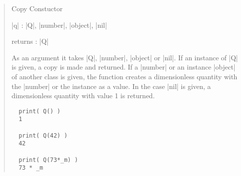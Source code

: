 \documentclass{ltxdoc}
\begin{document}
\begin{quote}
  Copy Constuctor

  \begin{description}
    \item |q| : |Q|, |number|, |object|, |nil|\\

    \item returns : |Q|\\
  \end{description}

  As an argument it takes |Q|, |number|, |object| or |nil|. If an instance of |Q| is given, a copy is made and returned. If a |number| or an instance |object| of another class is given, the function creates a dimensionless quantity with the |number| or the instance as a value. In the case |nil| is given, a dimensionless quantity with value 1 is returned.

  \subtitle{Example}
  \begin{lstlisting}
  print( Q() )
  1

  print( Q(42) )
  42

  print( Q(73*_m) )
  73 * _m
  \end{lstlisting}
\end{quote}
\end{document}
